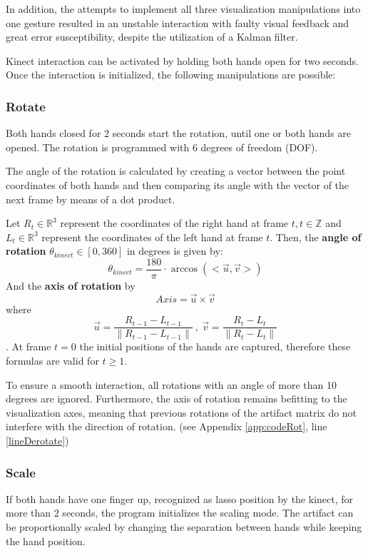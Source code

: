 \documentclass[12pt]{extarticle}
\newcommand{\R}{\mathbb{R}}
\newcommand{\Z}{\mathbb{Z}}
\begin{document}
In addition, the attempts to implement all three visualization manipulations into one gesture resulted in an unstable interaction with faulty visual feedback and great error susceptibility, despite the utilization of a Kalman filter.

Kinect interaction can be activated by holding both hands open for two seconds. Once the interaction is initialized, the following manipulations are possible:

\subsubsection {Rotate}\label{subsubsec Rot}
Both hands closed for 2 seconds start the rotation, until one or both hands are opened. The rotation is programmed with 6 degrees of freedom (DOF).

The angle of the rotation is calculated by creating a vector between the point coordinates of both hands and then comparing its angle with the vector of the next frame by means of a dot product.

Let $R_t\in \R^3$ represent the coordinates of the right hand at frame $t, t\in \Z$ and $L_t\in\R^3$ represent the coordinates of the left hand at frame $t$. Then, the \textbf{angle of rotation }$\theta_{kinect}\in [0, 360]$ in degrees is given by:
\[\theta_{kinect}=\frac{180}{\pi}\cdot \arccos(<\overrightarrow{u}, \overrightarrow{v}>)\]
And the \textbf{axis of rotation} by
\[Axis=\overrightarrow{u}\times \overrightarrow{v}\]
where $$\overrightarrow{u}=\frac{R_{t-1}-L_{t-1}}{\|R_{t-1}-L_{t-1}\|}\ , \ \overrightarrow{v}=\frac{R_t-L_t}{\|R_t-L_t\|}$$.
At frame $t=0$ the initial positions of the hands are captured, therefore these formulas are valid for $t\geq 1$.

To ensure a smooth interaction, all rotations with an angle of more than 10 degrees are ignored. Furthermore, the axis of rotation remains befitting to the visualization axes, meaning that previous rotations of the artifact matrix do not interfere with the direction of rotation. (see Appendix \ref{app:codeRot}, line \ref{lineDerotate})

\subsubsection {Scale}\label{subsubsec Scale} If both hands have one finger up, recognized as lasso position by the kinect, for more than 2 seconds, the program initializes the scaling mode. The artifact can be proportionally scaled by changing the separation between hands while keeping the hand position.
\end{document}
